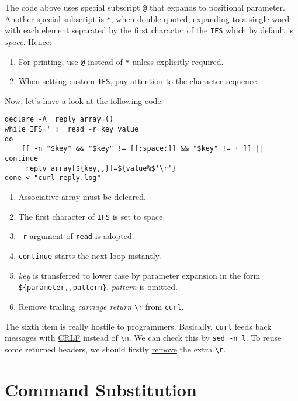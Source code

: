 The code above uses special subscript \lstinline|@| that expands
to positional parameter. Another special subscript is
\lstinline|*|, when double quoted, expanding to a single word with
each element separated by the first character of the
\lstinline|IFS| which by default is \textit{space}. Hence:

\begin{enumerate}
\item For printing, use \lstinline|@| instead of \lstinline|*|
  unless explicitly required.
\item When setting custom \lstinline|IFS|, pay attention to the
  character sequence.
\end{enumerate}

Now, let's have a look at the following code:

\begin{lstlisting}[caption={curl CRLF},label={lst:curl-crlf}]
declare -A _reply_array=()
while IFS=' :' read -r key value
do
    [[ -n "$key" && "$key" != [[:space:]] && "$key" != + ]] || continue
    _reply_array[${key,,}]=${value%$'\r'}
done < "curl-reply.log"
\end{lstlisting}

\begin{enumerate}
\item Associative array must be delcared.
\item The first character of \lstinline|IFS| is set to space.
\item \lstinline|-r| argument of \lstinline|read| is adopted.
\item \lstinline|continue| starts the next loop instantly.
\item \textit{key} is transferred to lower case by parameter
  expansion in the form
  \lstinline|${parameter,,pattern}|. \textit{pattern} is omitted.
\item Remove trailing \textit{carriage return} \lstinline|\r| from
  \lstinline|curl|.
\end{enumerate}

The sixth item is really hostile to programmers. Basically,
\lstinline|curl| feeds back messages with
\href{https://stackoverflow.com/a/30957952/2336707}{CRLF}
instead of \lstinline|\n|. We can check this by
\lstinline|sed -n l|. To reuse some returned headers, we should
firstly
\href{https://stackoverflow.com/a/35019553/2336707}{remove} the
extra \lstinline|\r|.

\section{Command Substitution}
\label{sec:bash-command-substitution}

